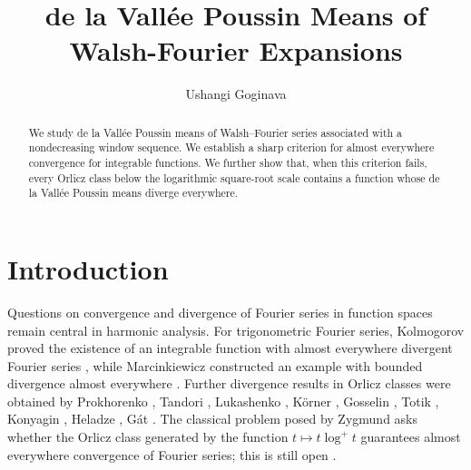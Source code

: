 \documentclass[11pt]{amsart}
\numberwithin{equation}{section}
\theoremstyle{plain}
\begin{document}
\title[de la Vall\'ee Poussin Means ]{de la Vall\'ee Poussin Means of Walsh-Fourier Expansions}
\author{Ushangi Goginava}
\address{Department of Mathematical Sciences, United Arab Emirates
University, P.O. Box 15551, Al Ain, Abu Dhabi, UAE}

\begin{abstract}
We study de la Vall\'ee Poussin means of Walsh--Fourier series associated
with a nondecreasing window sequence. We establish a sharp criterion for
almost everywhere convergence for integrable functions. We further show
that, when this criterion fails, every Orlicz class below the logarithmic
square-root scale contains a function whose de la Vall\'ee Poussin means
diverge everywhere.
\end{abstract}

\maketitle


\section{Introduction}

Questions on convergence and divergence of Fourier series in function spaces
remain central in harmonic analysis. For trigonometric Fourier series,
Kolmogorov proved the existence of an integrable function with almost
everywhere divergent Fourier series \cite%
{Kolmogorov-ae,Kolmogorov-everywhere}, while Marcinkiewicz constructed an
example with bounded divergence almost everywhere \cite{Marcinkiewicz}.
Further divergence results in Orlicz classes were obtained by Prokhorenko 
\cite{Prokhorenko}, Tandori \cite{Tandori-divergence}, Lukashenko \cite%
{Lukashenko}, K\"orner \cite{Korner-sets,Korner-everywhere}, Gosselin \cite%
{Gosselin}, Totik \cite{Totik}, Konyagin \cite%
{Konyagin-everywhere,Konyagin-subsequences,Konyagin-ICM}, Heladze \cite%
{Heladze}, G\'at \cite{gat}. The classical problem posed by Zygmund asks
whether the Orlicz class generated by the function $t\mapsto t\log^{+}t$
guarantees almost everywhere convergence of Fourier series; this is still
open \cite[Ch. XIII]{Zygmund}.
\end{document}
